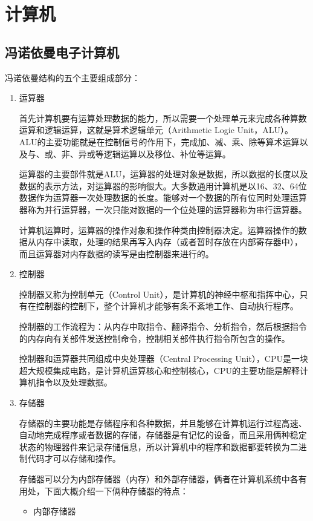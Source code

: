 
\section{计算机}

\subsection{冯诺依曼电子计算机}

冯诺依曼结构的五个主要组成部分：
\begin{enumerate}
  \item 运算器
  
  首先计算机要有运算处理数据的能力，所以需要一个处理单元来完成各种算数运算和逻辑运算，这就是算术逻辑单元（Arithmetic Logic Unit，ALU）。ALU的主要功能就是在控制信号的作用下，完成加、减、乘、除等算术运算以及与、或、非、异或等逻辑运算以及移位、补位等运算。

  运算器的主要部件就是ALU，运算器的处理对象是数据，所以数据的长度以及数据的表示方法，对运算器的影响很大。大多数通用计算机是以16、32、64位数据作为运算器一次处理数据的长度。能够对一个数据的所有位同时处理运算器称为并行运算器，一次只能对数据的一个位处理的运算器称为串行运算器。

  计算机运算时，运算器的操作对象和操作种类由控制器决定。运算器操作的数据从内存中读取，处理的结果再写入内存（或者暂时存放在内部寄存器中），而且运算器对内存数据的读写是由控制器来进行的。
  \item 控制器
  
  控制器又称为控制单元（Control Unit），是计算机的神经中枢和指挥中心，只有在控制器的控制下，整个计算机才能够有条不紊地工作、自动执行程序。

    控制器的工作流程为：从内存中取指令、翻译指令、分析指令，然后根据指令的内存向有关部件发送控制命令，控制相关部件执行指令所包含的操作。

    控制器和运算器共同组成中央处理器（Central Processing Unit），CPU是一块超大规模集成电路，是计算机运算核心和控制核心，CPU的主要功能是解释计算机指令以及处理数据。
  \item 存储器
  
  存储器的主要功能是存储程序和各种数据，并且能够在计算机运行过程高速、自动地完成程序或者数据的存储，存储器是有记忆的设备，而且采用俩种稳定状态的物理器件来记录存储信息，所以计算机中的程序和数据都要转换为二进制代码才可以存储和操作。

  存储器可以分为内部存储器（内存）和外部存储器，俩者在计算机系统中各有用处，下面大概介绍一下俩种存储器的特点：

  \begin{itemize}
    \item 内部存储器
    

\end{itemize}
\end{enumerate}
